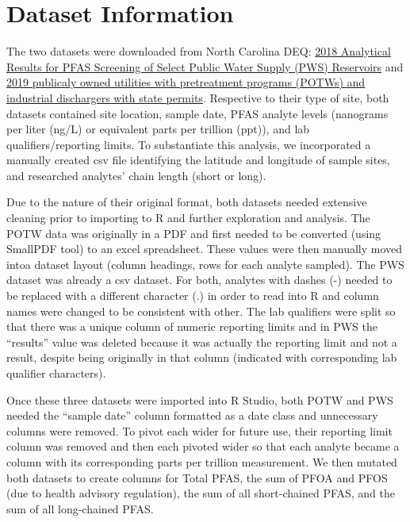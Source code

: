 \documentclass[
  12pt,
]{article}
\begin{document}
\hypertarget{dataset-information}{%
\section{Dataset Information}\label{dataset-information}}

The two datasets were downloaded from North Carolina DEQ:
\href{https://deq.nc.gov/about/divisions/water-resources/water-resources-science-and-data/water-sciences-home-page/emerging}{2018
Analytical Results for PFAS Screening of Select Public Water Supply
(PWS) Reservoirs} and
\href{https://files.nc.gov/ncdeq/Water\%20Resources/GIS/Data/Emerging_Compounds_Mastersheet_12202019.pdf}{2019
publicaly owned utilities with pretreatment programs (POTWs) and
industrial dischargers with state permits}. Respective to their type of
site, both datasets contained site location, sample date, PFAS analyte
levels (nanograms per liter (ng/L) or equivalent parts per trillion
(ppt)), and lab qualifiers/reporting limits. To substantiate this
analysis, we incorporated a manually created csv file identifying the
latitude and longitude of sample sites, and researched analytes' chain
length (short or long).

Due to the nature of their original format, both datasets needed
extensive cleaning prior to importing to R and further exploration and
analysis. The POTW data was originally in a PDF and first needed to be
converted (using SmallPDF tool) to an excel spreadsheet. These values
were then manually moved intoa dataset layout (column headings, rows for
each analyte sampled). The PWS dataset was already a csv dataset. For
both, analytes with dashes (-) needed to be replaced with a different
character (.) in order to read into R and column names were changed to
be consistent with other. The lab qualifiers were split so that there
was a unique column of numeric reporting limits and in PWS the
``results'' value was deleted because it was actually the reporting
limit and not a result, despite being originally in that column
(indicated with corresponding lab qualifier characters).

Once these three datasets were imported into R Studio, both POTW and PWS
needed the ``sample date'' column formatted as a date class and
unnecessary columns were removed. To pivot each wider for future use,
their reporting limit column was removed and then each pivoted wider so
that each analyte became a column with its corresponding parts per
trillion measurement. We then mutated both datasets to create columns
for Total PFAS, the sum of PFOA and PFOS (due to health advisory
regulation), the sum of all short-chained PFAS, and the sum of all
long-chained PFAS.
\end{document}
